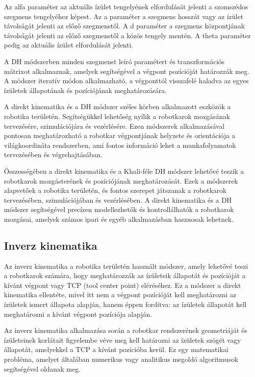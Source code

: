 Az alfa paraméter az aktuális ízület tengelyének elfordulását jelenti a szomszédos szegmens tengelyéhez képest. Az a paraméter a szegmens hosszát vagy az ízület távolságát jelenti az előző szegmenstől. A d paraméter a szegmens központjának távolságát jelenti az előző szegmenstől a közös tengely mentén. A theta paraméter pedig az aktuális ízület elfordulását jelenti.

A DH módszerben minden szegmenst leíró paramétert és transzformációs mátrixot alkalmaznak, amelyek segítségével a végpont pozícióját határozzák meg. A módszer iteratív módon alkalmazható, a végponttól visszafelé haladva az egyes ízületek állapotának és pozíciójának meghatározására.

A direkt kinematika és a DH módszer széles körben alkalmazott eszközök a robotika területén. Segítségükkel lehetőség nyílik a robotkarok mozgásának tervezésére, szimulációjára és vezérlésére. Ezen módszerek alkalmazásával pontosan meghatározható a robotkar végpontjának helyzete és orientációja a világkoordináta rendszerben, ami fontos információ lehet a munkafolyamatok tervezésében és végrehajtásában.

Összességében a direkt kinematika és a Khali-féle DH módszer lehetővé teszik a robotkarok mozgásterének és pozíciójának meghatározását. Ezek a módszerek alapvetőek a robotika területén, és fontos szerepet játszanak a robotkarok tervezésében, szimulációjában és vezérlésében. A direkt kinematika és a DH módszer segítségével precízen modellezhetők és kontrollálhatók a robotkarok mozgásai, amelyek számos ipari és egyéb alkalmazásban hasznosak lehetnek.

\subsection{Inverz kinematika}
Az inverz kinematika a robotika területén használt módszer, amely lehetővé teszi a robotkarok számára, hogy meghatározzák az ízületeik állapotát és pozícióját a kívánt végpont vagy TCP (tool center point) eléréséhez. Ez a módszer a direkt kinematika ellentéte, mivel itt nem a végpont pozícióját kell meghatározni az ízületek ismert állapota alapján, hanem éppen fordítva: az ízületek állapotát kell meghatározni a kívánt végpont pozíciója alapján.

Az inverz kinematika alkalmazása során a robotkar rendszerének geometriáját és ízületeinek korlátait figyelembe véve meg kell határozni az ízületek szögét vagy állapotát, amelyekkel a TCP a kívánt pozícióba kerül. Ez egy matematikai probléma, amelyet általában numerikus vagy analitikus megoldó algoritmusok segítségével oldanak meg.

